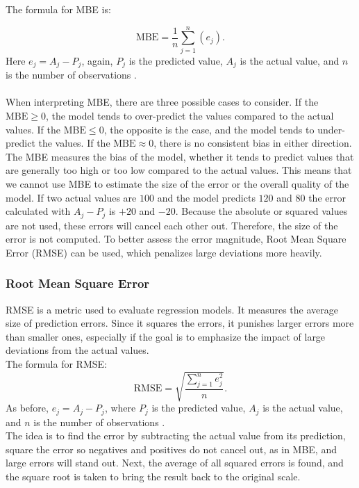 \noindent The formula for MBE is:

\begin{equation}
\text{MBE}=\frac{1}{n}\sum_{j=1}^{n}(e_{j}).
\end{equation}
\noindent Here $e_{j}=A_{j}-P_{j}$, again, $P_{j}$ is the predicted value, $A_{j}$ is the actual value, and $n$ is the number of observations \cite{metrics}.
\\\\

\noindent When interpreting MBE, there are three possible cases to consider. If the $\text{MBE}\geq 0$, the model tends to over-predict the values compared to the actual values. If the $\text{MBE}\leq0$, the opposite is the case, and the model tends to under-predict the values. If the $\text{MBE}\approx0$, there is no consistent bias in either direction.
\\

\noindent The MBE measures the bias of the model, whether it tends to predict values that are generally too high or too low compared to the actual values. This means that we cannot use MBE to estimate the size of the error or the overall quality of the model. If two actual values are $100$ and the model predicts $120$ and $80$ the error calculated with $A_{j}-P_{j}$ is $+20$ and $-20$. Because the absolute or squared values are not used, these errors will cancel each other out. Therefore, the size of the error is not computed. To better assess the error magnitude, Root Mean Square Error (RMSE) can be used, which penalizes large deviations more heavily.

\newpage

\subsubsection{Root Mean Square Error}   

RMSE is a metric used to evaluate regression models. It measures the average size of prediction errors. Since it squares the errors, it punishes larger errors more than smaller ones, especially if the goal is to emphasize the impact of large deviations from the actual values.
\\
The formula for RMSE:
\begin{equation}
	\text{RMSE}=\sqrt{\frac{ \sum_{j=1}^{n} e_j^2 }{n}}.
\end{equation}
As before, $e_{j}=A_{j}-P_{j}$, where $P_{j}$ is the predicted value, $A_{j}$ is the actual value, and $n$ is the number of observations \cite{metrics}.
\\ The idea is to find the error by subtracting the actual value from its prediction, square the error so negatives and positives do not cancel out, as in MBE, and large errors will stand out. Next, the average of all squared errors is found, and the square root is taken to bring the result back to the original scale. 
\\

